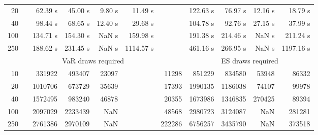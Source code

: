 {{\begin{longtable}{rr rrrr r rrrr}
20 & & 62.39 s & 45.00 s & 9.80 s & 11.49 s && 122.63 s & 76.97 s & 12.16 s & 18.79 s \\ 
40 & & 98.44 s & 68.65 s & 12.40 s & 29.68 s && 104.78 s & 92.76 s & 27.15 s & 37.99 s \\ 
100 & & 134.71 s & 154.30 s &  NaN s & 159.98 s && 191.38 s & 214.46 s &  NaN s & 211.24 s \\ 
250 & & 188.62 s & 231.45 s &  NaN s & 1114.57 s && 461.16 s & 266.95 s &  NaN s & 1197.16 s \\ 
\hline 
 && \multicolumn{4}{c}{VaR draws required} &&   \multicolumn{4}{c}{ES draws required} \\  \cline{3-6}  \cline{8-11} 
10 & & 331922 & 493407 & 23097 & & 11298 & 851229 & 834580 & 53948  & 86332 \\ 
20 & & 1010706 & 673729 & 35639 & & 17393 & 1990135 & 1186038 & 74107  & 99978 \\ 
40 & & 1572495 & 983240 & 46878 & & 20355 & 1673986 & 1346835 & 270425  & 89394 \\ 
100 & & 2097029 & 2233439 & NaN & & 48568 & 2980723 & 3124087 & NaN  & 281281 \\ 
250 & & 2761386 & 2970109 & NaN & & 222286 & 6756257 & 3435790 & NaN  & 373518 \\ 
\hline 
\end{longtable} 
} 
} 
